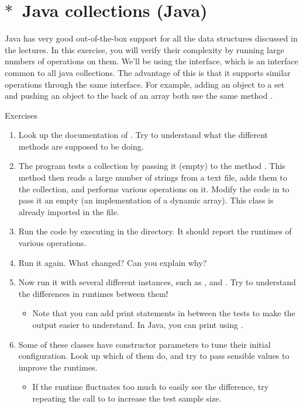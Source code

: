 \section{$\ast$~Java collections (Java)}

Java has very good out-of-the-box support for all the data structures discussed in the lectures. In this exercise, you will verify their complexity by running large numbers of operations on them. We'll be using the  interface, which is an interface common to all java collections. The advantage of this is that it supports similar operations through the same interface. For example, adding an object to a set and pushing an object to the back of an array both use the same method .
%
\begin{mybox}{Exercises}
    \begin{enumerate}
        \item Look up the documentation of . Try to understand what the different methods are supposed to be doing.
        \item The program tests a collection by passing it (empty) to the method . This method then reads a large number of strings from a text file, adds them to the collection, and performs various operations on it. Modify the code in  to pass it an empty  (an implementation of a dynamic array). This class is already imported in the file.
        \item Run the code by executing  in the  directory. It should report the runtimes of various operations.
        \item Run it again. What changed? Can you explain why?
        \item Now run it with several different  instances, such as ,  and . Try to understand the differences in runtimes between them!
            \begin{itemize}
                \item Note that you can add print statements in between the tests to make the output easier to understand. In Java, you can print using .
            \end{itemize}
        \item Some of these classes have constructor parameters to tune their initial configuration. Look up which of them do, and try to pass sensible values to improve the runtimes.
            \begin{itemize}
                \item If the runtime fluctuates too much to easily see the difference, try repeating the call to  to increase the test sample size.
            \end{itemize}
    \end{enumerate}
\end{mybox}

